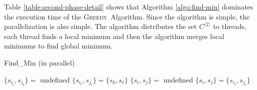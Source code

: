 \documentclass[12pt]{article}
\newcommand{\comment}[2]{{\color{red}{\bf (#1: #2)}}}
\newcommand{\greedyAlgo}{\textsc{Greedy}}
\begin{document}
\begin{table}[ht]
	\begin{center}
	\end{center}
	\caption{\comment{sertac}{second phase deneyleri}}
	\label{table:second-phase-detail}
\end{table}

Table \ref{table:second-phase-detail} shows that Algorithm \ref{algo:find-min} dominates the execution time of the \greedyAlgo\ Algorithm. Since the algorithm is simple, the parallelization is also simple. The algorithm distributes the set $C^{\langle 2 \rangle}$ to threads, each thread finds a local minimum and then the algorithm merges local minimums to find global minimum.



\begin{algorithm}[ht]
	\caption{Find\_Min (in parallel)}
	\label{algo:find-min-parallel}
	
	{
	$\{ s_{i_t},s_{j_t} \} =$ undefined
	}
	{
		{
			$\{ s_{i_t},s_{j_t} \} = \{ s_k, s_\ell \}$
		}
	}
	$\{ s_i,s_j \} =$ undefined\;
	{
		{
			$\{ s_i,s_j \} = \{ s_{i_t},s_{j_t} \}$
		}
	}
\end{algorithm}
\end{document}
